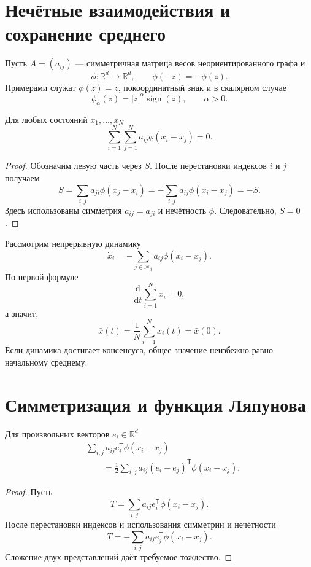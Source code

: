\section{Нечётные взаимодействия и сохранение среднего}

Пусть \(A=(a_{ij})\) --- симметричная матрица весов
неориентированного графа и
\[
    \phi\colon\mathbb R^d\to\mathbb R^d,
    \qquad
    \phi(-z)=-\phi(z).
\]
Примерами служат \(\phi(z)=z\), покоординатный знак и в скалярном
случае
\[
    \phi_\alpha(z)
    =
    |z|^\alpha\operatorname{sign}(z),
    \qquad \alpha>0.
\]

\begin{lemma}
Для любых состояний \(x_1,\ldots,x_N\)
\[
    \sum_{i=1}^{N}\sum_{j=1}^{N}
    a_{ij}\phi(x_i-x_j)=0.
\]
\end{lemma}

\begin{proof}
Обозначим левую часть через \(S\). После перестановки индексов
\(i\) и \(j\) получаем
\[
    S
    =
    \sum_{i,j}a_{ji}\phi(x_j-x_i)
    =
    -\sum_{i,j}a_{ij}\phi(x_i-x_j)
    =-S.
\]
Здесь использованы симметрия \(a_{ij}=a_{ji}\) и нечётность
\(\phi\). Следовательно, \(S=0\).
\end{proof}

Рассмотрим непрерывную динамику
\[
    \dot x_i
    =
    -\sum_{j\in\mathcal N_i}
    a_{ij}\phi(x_i-x_j).
\]
По первой формуле
\[
    \frac{\mathrm d}{\mathrm dt}
    \sum_{i=1}^{N}x_i
    =0,
\]
а значит,
\[
    \bar x(t)
    =
    \frac1N\sum_{i=1}^{N}x_i(t)
    =
    \bar x(0).
\]
Если динамика достигает консенсуса, общее значение неизбежно равно
начальному среднему.

\section{Симметризация и функция Ляпунова}

\begin{lemma}
Для произвольных векторов \(e_i\in\mathbb R^d\)
\[
\begin{aligned}
    &\sum_{i,j}
    a_{ij}e_i^{\mathsf T}\phi(x_i-x_j)
    \\
    &\qquad=
    \frac12
    \sum_{i,j}
    a_{ij}(e_i-e_j)^{\mathsf T}\phi(x_i-x_j).
\end{aligned}
\]
\end{lemma}

\begin{proof}
Пусть
\[
    T=\sum_{i,j}a_{ij}e_i^{\mathsf T}\phi(x_i-x_j).
\]
После перестановки индексов и использования симметрии и нечётности
\[
    T
    =
    -\sum_{i,j}a_{ij}e_j^{\mathsf T}\phi(x_i-x_j).
\]
Сложение двух представлений даёт требуемое тождество.
\end{proof}

